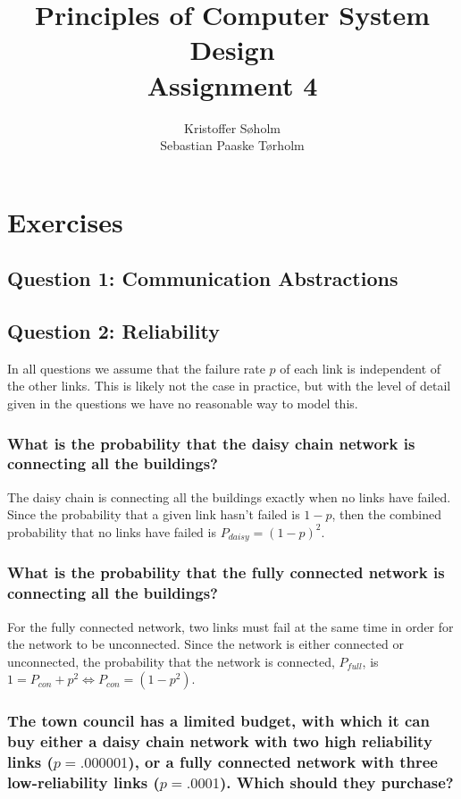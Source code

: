 \documentclass[11pt,a4paper]{article}
\title{Principles of Computer System Design\\Assignment 4}
\author{Kristoffer Søholm\\Sebastian Paaske Tørholm}
\begin{document}
\maketitle

\section*{Exercises}
\subsection*{Question 1: Communication Abstractions}


\subsection*{Question 2: Reliability} 
In all questions we assume that the failure rate $p$ of each link is
independent of the other links. This is likely not the case in practice, but
with the level of detail given in the questions we have no reasonable way to
model this.

\subsubsection*{What is the probability that the daisy chain network is
                connecting all the buildings?}

The daisy chain is connecting all the buildings exactly when no links have
failed. Since the probability that a given link hasn't failed is $1-p$, then
the combined probability that no links have failed is $P_{daisy} = (1-p)^2$.

\subsubsection*{What is the probability that the fully connected network is
                connecting all the buildings?}

For the fully connected network, two links must fail at the same time in order
for the network to be unconnected. Since the network is either connected or
unconnected, the probability that the network is connected, $P_{full}$, is $1 =
P_{con} + p^2 \Leftrightarrow P_{con} = (1-p^2)$.

\subsubsection*{The town council has a limited budget, with which it can buy
either a daisy chain network with two high reliability links ($p = .000001$),
or a fully connected network with three low-reliability links ($p = .0001$).
Which should they purchase?}
\end{document}
